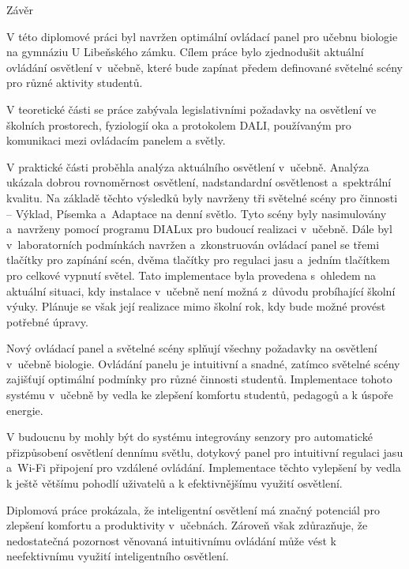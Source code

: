 \nonum\chap Závěr

V této diplomové práci byl navržen optimální ovládací panel pro učebnu
biologie na gymnáziu U Libeňského zámku.
Cílem práce bylo zjednodušit aktuální ovládání osvětlení v~učebně, které bude zapínat předem definované světelné scény pro různé aktivity studentů.


V teoretické části se práce zabývala legislativními požadavky na osvětlení ve školních prostorech,
fyziologií oka a protokolem DALI, používaným pro komunikaci mezi ovládacím panelem a světly.


V praktické části proběhla analýza aktuálního osvětlení v~učebně.
Analýza ukázala dobrou rovnoměrnost osvětlení, nadstandardní osvětlenost a~spektrální kvalitu.
Na základě těchto výsledků byly navrženy tři světelné
scény pro činnosti -- Výklad, Písemka a~Adaptace na denní světlo.
Tyto scény byly nasimulovány a~navrženy pomocí programu DIALux pro budoucí realizaci v~učebně.
Dále byl v~laboratorních podmínkách navržen a~zkonstruován ovládací panel se třemi tlačítky pro zapínání scén,
dvěma tlačítky pro regulaci jasu a~jedním tlačítkem pro celkové vypnutí světel.
Tato implementace byla provedena s~ohledem na aktuální situaci, kdy instalace v~učebně není možná
z~důvodu probíhající školní výuky. Plánuje se však její realizace mimo školní rok, kdy bude možné provést potřebné úpravy.

Nový ovládací panel a světelné scény splňují všechny požadavky na osvětlení v~učebně biologie.
Ovládání panelu je intuitivní a snadné, zatímco světelné scény zajišťují optimální podmínky pro různé činnosti studentů.
Implementace tohoto systému v~učebně by vedla ke zlepšení komfortu studentů, pedagogů a k úspoře energie.

V budoucnu by mohly být do systému integrovány senzory pro automatické přizpůsobení
osvětlení dennímu světlu, dotykový panel pro intuitivní regulaci jasu a~Wi-Fi připojení pro vzdálené ovládání.
Implementace těchto vylepšení by vedla k ještě většímu pohodlí uživatelů a k efektivnějšímu využití osvětlení.

Diplomová práce prokázala, že inteligentní osvětlení má značný potenciál
pro zlepšení komfortu a produktivity v~učebnách.
Zároveň však zdůrazňuje, že nedostatečná pozornost věnovaná
intuitivnímu ovládání může vést k neefektivnímu využití inteligentního osvětlení.








